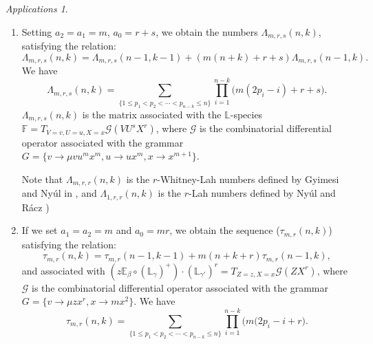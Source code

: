 \documentclass[12pt,a4paper]{article}
\theoremstyle{definition} %
\theoremstyle{remark}
\theoremstyle{examples}
\newtheorem{appli}[theorem]{Applications}
\newcommand{\coss}{\cdots}
\begin{document}
\begin{appli}
\begin{enumerate}
\item	Setting $a_2=a_1=m$, $a_0=r+s$, we obtain the numbers $\Lambda_{m,r,s}(n,k)$, satisfying the relation:
\begin{equation}
\label{equak}
\Lambda_{m,r,s}(n,k)=\Lambda_{m,r,s}(n-1,k-1)+(m(n+k)+r+s)\Lambda_{m,r,s}(n-1,k).
\end{equation}
We have \begin{equation}
\Lambda_{m,r,s}(n,k)= \sum_{\{1\leq p_1<p_2<\coss <p_{n-k}\leq n\}}  
\prod_{i=1}^{n-k} \Big( m(2p_i-i)+r+s \Big).
\end{equation} 
$\Lambda_{m,r,s}(n,k)$ is the matrix associated with the $\mathbb{L}$-species $\mathbb{F}=T_{V=v,U=u,X=x}\mathcal{G}(VU^sX^r)$, where
$\mathcal{G}$ is the combinatorial differential operator associated with the grammar $G=\{v \to \mu vu^m x^m, u \rightarrow ux^m , x \to x^{m+1} \}$.

Note that $\Lambda_{m,r,r}(n,k)$ is the $r$-Whitney-Lah numbers defined by
Gyimesi and  Ny\'ul in \cite{Gyi-Nyul}, and $\Lambda_{1,r,r}(n,k)$ is the $r$-Lah numbers defined by Ny\'ul and R\'acz \cite{Niul-Racz})
\item If we set $a_1=a_2=m$ and $a_0=mr$, we obtain the sequence ($\tau_{m,r}(n,k)$)
satisfying the relation: 
\begin{equation} 
\label{equatau}
\tau_{m,r}(n,k)=\tau_{m,r}(n-1,k-1)+m(n+k+r)\tau_{m,r}(n-1,k),
\end{equation}
and associated with $(z\mathbb{E}_\beta \circ(\mathbb{L}_{\gamma})^+)\cdot(\mathbb{L}_{\gamma'})^r=T_{Z=z,X=x}\mathcal{G}(ZX^r)$, where
$\mathcal{G}$ is the combinatorial differential operator associated with the grammar $G=\{v \to \mu z x^r, x \to mx^{2} \}$.
We have 
\begin{equation}\label{equabase3}
\tau_{m,r}(n,k)= \sum_{\{1\leq p_1<p_2<\coss <p_{n-k}\leq n\}}  
\prod_{i=1}^{n-k} \Big( m(2p_i-i+r \Big).
\end{equation}
\end{enumerate}

\end{appli}
\end{document}
